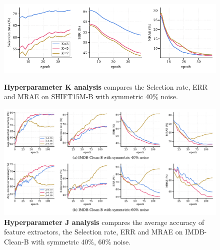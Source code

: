\documentclass{article}
\theoremstyle{plain}
\theoremstyle{definition}
\theoremstyle{remark}
\begin{document}
\begin{figure}[th]
\begin{center}
\centerline{\includegraphics[width=\textwidth]{imgs/hp_analysis_shift15m_k.pdf}}
\vskip -0.15in
\caption{
    \textbf{Hyperparameter K analysis} compares the Selection rate, ERR and MRAE on SHIFT15M-B with symmetric 40\% noise.}
\vskip -0.15in
\label{fig:analysis_shift15m_k}
\end{center}
\end{figure}

\begin{figure}[th]
\begin{center}
\centerline{\includegraphics[width=\textwidth]{imgs/hp_analysis_imdb_j.pdf}}
\vskip -0.15in
\caption{
    \textbf{Hyperparameter J analysis} compares the average accuracy of feature extractors, the Selection rate, ERR and MRAE on IMDB-Clean-B with symmetric 40\%, 60\% noise.}
\label{fig:analysis_imdb_j}
\end{center}
\end{figure}
\end{document}
